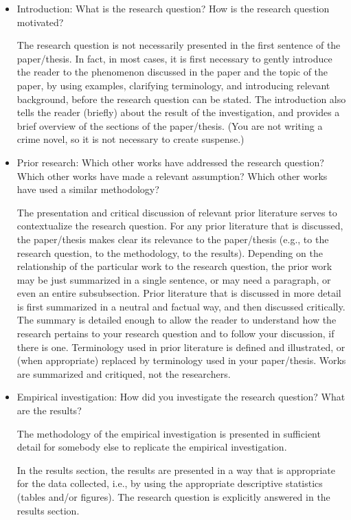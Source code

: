 \documentclass[11pt,fleqn,a4paper/thesis]{article}
\newcommand{\6}{\mbox{$[\hspace*{-.6mm}[$}}
\newcommand{\9}{\mbox{$]\hspace*{-.6mm}]$}}
\begin{document}
\begin{itemize}[itemsep=-1pt,leftmargin=2.5ex,topsep=-2pt]
\begin{enumerate}
\begin{itemize}[leftmargin=2.5ex,topsep=-2pt]

\item Introduction: What is the research question? How is the research question motivated?

The research question is not necessarily presented in the first sentence of the paper/thesis. In fact, in most cases, it is first necessary to gently introduce the reader to the phenomenon discussed in the paper and the topic of the paper, by using examples, clarifying terminology, and introducing relevant background, before the research question can be stated. The introduction also tells the reader (briefly) about the result of the investigation, and provides a brief overview of the sections of the paper/thesis. (You are not writing a crime novel, so it is not necessary to create suspense.)

\item Prior research: Which other works have addressed the research question? Which other works have made a relevant assumption? Which other works have used a similar methodology?

The presentation and critical discussion of relevant prior literature serves to contextualize the research question. For any prior literature that is discussed, the paper/thesis makes clear its relevance to the paper/thesis (e.g., to the research question, to the methodology, to the results). Depending on the relationship of the particular work to the research question, the prior work may be just summarized in a single sentence, or may need a paragraph, or even an entire subsubsection. Prior literature that is discussed in more detail is first summarized in a neutral and factual way, and then discussed critically. The summary is detailed enough to allow the reader to understand how the research pertains to your research question and to follow your discussion, if there is one. Terminology used in prior literature is defined and illustrated, or (when appropriate) replaced by terminology used in your paper/thesis. Works are summarized and critiqued, not the researchers.

\item Empirical investigation: How did you investigate the research question? What are the results?

The methodology of the empirical investigation is presented in sufficient detail for somebody else to replicate the empirical investigation. 

In the results section, the results are presented in a way that is appropriate for the data collected, i.e., by using the appropriate descriptive statistics (tables and/or figures). The research question is explicitly answered in the results section.


\end{itemize}
\end{enumerate}
\end{itemize}
\end{document}
